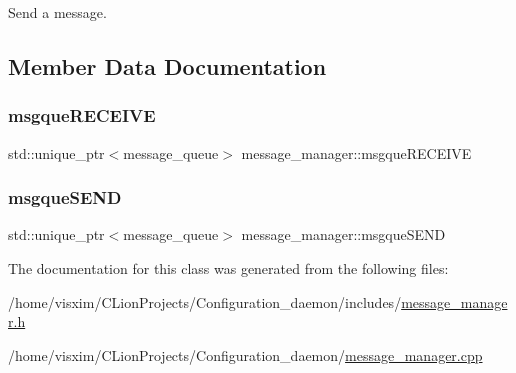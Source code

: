 Send a message. 



\subsection{Member Data Documentation}
\mbox{\label{classmessage__manager_a02b3ec0e7e4003a7f8483382e0b9d813}} 
\subsubsection{\texorpdfstring{msgque\+R\+E\+C\+E\+I\+VE}{msgqueRECEIVE}}
{\footnotesize\ttfamily std\+::unique\+\_\+ptr$<$message\+\_\+queue$>$ message\+\_\+manager\+::msgque\+R\+E\+C\+E\+I\+VE\hspace{0.3cm}{\ttfamily [private]}}

\mbox{\label{classmessage__manager_a587e012eba883e294532f4d28bd54a47}} 
\subsubsection{\texorpdfstring{msgque\+S\+E\+ND}{msgqueSEND}}
{\footnotesize\ttfamily std\+::unique\+\_\+ptr$<$message\+\_\+queue$>$ message\+\_\+manager\+::msgque\+S\+E\+ND\hspace{0.3cm}{\ttfamily [private]}}



The documentation for this class was generated from the following files\+:\begin{DoxyCompactItemize}
\item 
/home/visxim/\+C\+Lion\+Projects/\+Configuration\+\_\+daemon/includes/\hyperlink{message__manager_8h}{message\+\_\+manager.\+h}\item 
/home/visxim/\+C\+Lion\+Projects/\+Configuration\+\_\+daemon/\hyperlink{message__manager_8cpp}{message\+\_\+manager.\+cpp}\end{DoxyCompactItemize}
